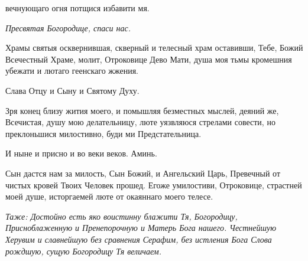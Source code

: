вечнующаго огня потщися избавити мя.



 \itshape  Пресвятая Богородице, спаси нас.
\normalfont{}


   Храмы святыя осквернившая, скверный и телесный храм оставивши,
Тебе, Божий Всечестный Храме, молит, Отроковице Дево Мати, душа моя
тьмы кромешния убежати и лютаго геенскаго жжения.



   Слава Отцу и Сыну и Святому Духу.



   Зря конец близу жития моего, и помышляя безместных мыслей, деяний
же, Всечистая, душу мою делательницу, люте уязвляюся стрелами совести,
но преклоньшися милостивно, буди ми Предстательница.



   И ныне и присно и во веки веков. Аминь.



   Сын дастся нам за милость, Сын Божий, и Ангельский Царь,
Превечный от чистых кровей Твоих Человек прошед. Егоже умилостиви,
Отроковице, страстней моей душе, исторгаемей люте от окаяннаго моего
телесе.



 \itshape Таже:\normalfont{} Достойно есть яко воистинну блажити Тя, Богородицу,
Присноблаженную и Пренепорочную и Матерь Бога нашего. Честнейшую
Херувим и славнейшую без сравнения Серафим, без истления Бога Слова
рождшую, сущую Богородицу Тя величаем.

   

\mychapterending